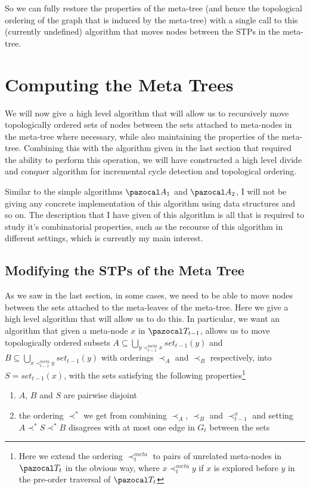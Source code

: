 \documentclass{report}
\begin{document}
So we can fully restore the properties of the meta-tree (and hence the topological ordering of the graph that is induced by the meta-tree) with a single call to this (currently undefined) algorithm that moves nodes between the STPs in the meta-tree.

\section{Computing the Meta Trees}

We will now give a high level algorithm that will allow us to recursively move topologically ordered sets of nodes between the sets attached to meta-nodes in the meta-tree where necessary, while also maintaining the properties of the meta-tree. Combining this with the algorithm given in the last section that required the ability to perform this operation, we will have constructed a high level divide and conquer algorithm for incremental cycle detection and topological ordering.

Similar to the simple algorithms $\pazocal A_1$ and $\pazocal A_2$, I will not be giving any concrete implementation of this algorithm using data structures and so on. The description that I have given of this algorithm is all that is required to study it's combinatorial properties, such as the recourse of this algorithm in different settings, which is currently my main interest. 

\subsection{Modifying the STPs of the Meta Tree}

As we saw in the last section, in some cases, we need to be able to move nodes between the sets attached to the meta-leaves of the meta-tree. Here we give a high level algorithm that will allow us to do this. In particular, we want an algorithm that given a meta-node $x$ in $\pazocal T_{t-1}$, allows us to move topologically ordered subsets $A \subseteq \bigcup_{y \prec^{meta}_{t-1} x} set_{t-1}(y)$ and $B \subseteq \bigcup_{x \prec^{meta}_{t-1} y} set_{t-1}(y)$ with orderings $\prec_{A}$ and $\prec_{B}$ respectively, into $S=set_{t-1}(x)$, with the sets satisfying the following properties\footnote{Here we extend the ordering $\prec^{meta}_t$ to pairs of unrelated meta-nodes in $\pazocal T_t$ in the obvious way, where $x \prec^{meta}_t y$ if $x$ is explored before $y$ in the pre-order traversal of $\pazocal T_t$}

\begin{enumerate}
\item $A$, $B$ and $S$ are pairwise disjoint
\item the ordering $\prec^{*}$ we get from combining $\prec_{A}$, $\prec_{B}$ and $\prec_{t-1}^x$ and setting $A \prec^{*} S \prec^{*} B$ disagrees with at most one edge in $G_t$ between the sets
\end{enumerate}
\end{document}
